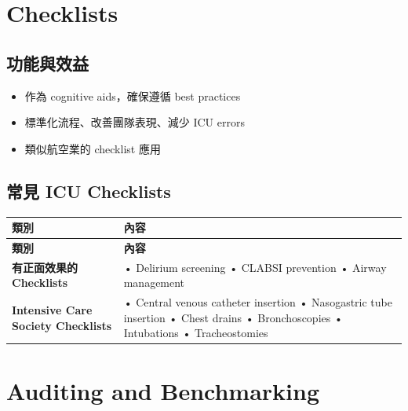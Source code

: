 \documentclass[12pt,a4paper]{article}
\begin{document}
\section{Checklists}

\subsection{功能與效益}

\begin{itemize}
    \item 作為 cognitive aids，確保遵循 best practices
    \item 標準化流程、改善團隊表現、減少 ICU errors
    \item 類似航空業的 checklist 應用
\end{itemize}

\subsection{常見 ICU Checklists}

\begin{longtable}{p{5cm}p{9cm}}
\toprule
\textbf{類別} & \textbf{內容} \\
\midrule
\endfirsthead

\toprule
\textbf{類別} & \textbf{內容} \\
\midrule
\endhead

\bottomrule
\endfoot

\textbf{有正面效果的 Checklists} &
• Delirium screening\newline
• CLABSI prevention\newline
• Airway management \\
\midrule
\textbf{Intensive Care Society Checklists} &
• Central venous catheter insertion\newline
• Nasogastric tube insertion\newline
• Chest drains\newline
• Bronchoscopies\newline
• Intubations\newline
• Tracheostomies \\
\bottomrule
\end{longtable}

\section{Auditing and Benchmarking}
\end{document}
